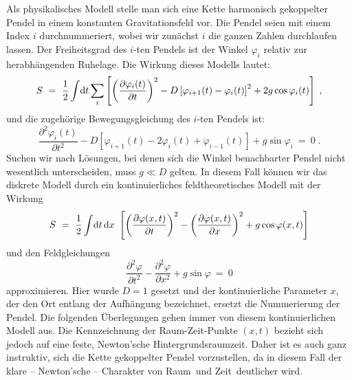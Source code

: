 Als physikalisches Modell stelle man sich eine Kette harmonisch gekoppelter
Pendel in einem konstanten Gravitationsfeld vor. Die Pendel seien
mit einem Index $i$ durchnummeriert, wobei wir zun\"achst $i$ die
ganzen Zahlen durchlaufen lassen. Der Freiheitsgrad des $i$-ten 
Pendels ist der Winkel $\varphi_i$ relativ zur herabh\"angenden
Ruhelage. Die Wirkung dieses Modells lautet:
\[  S ~=~ \frac{1}{2} \int \! {\rm d} t \sum_i \left[   
       \left( \frac{\partial \varphi_i(t)}{\partial t} \right)^2 -
       D \left[ \varphi_{i+1}(t) -\varphi_i(t) \right]^2 +
       2 g \cos \varphi_i(t)  \right]  \;,    \]
und die zugeh\"orige Bewegungsgleichung des 
$i$-ten Pendels ist:
\begin{equation}
\label{discrete}
  \frac{\partial^2 \varphi_i(t)}{\partial t^2} -         
  D [\varphi_{i+1}(t) - 2 \varphi_i(t) + \varphi_{i-1}(t) ]
  + g \sin \varphi_i ~=~ 0 \;. 
\end{equation}             
Suchen wir nach L\"osungen, bei denen sich die Winkel benachbarter Pendel 
nicht wesentlich unterscheiden, muss $g\ll D$ gelten. 
In diesem Fall k\"onnen wir das diskrete Modell
durch ein kontinuierliches feldtheoretisches Modell mit der Wirkung
\[  S ~=~ \frac{1}{2} \int \! {\rm d} t\, {\rm d} x~ \left[   
        \left( \frac{\partial \varphi(x,t)}{\partial t} \right)^2 -
        \left( \frac{\partial \varphi(x,t)}{\partial x} \right)^2 +
        g \cos \varphi(x,t)  \right]     \]
und den Feldgleichungen 
\begin{equation}
\label{eq_cont}
  \frac{\partial^2 \varphi}{\partial t^2} -         
    \frac{\partial^2 \varphi}{\partial x^2} + g \sin \varphi ~=~ 0 
\end{equation}             
approximieren. Hier wurde $D=1$ gesetzt und der kontinuierliche
Parameter $x$, der den Ort entlang der Aufh\"angung bezeichnet,
ersetzt die Nummerierung der Pendel. Die folgenden \"Uberlegungen
gehen immer von diesem kontinuierlichen Modell aus.
Die Kennzeichnung der Raum-Zeit-Punkte $(x,t)$ bezieht sich jedoch auf 
eine feste, Newton'sche Hinter\-grunds\-raum\-zeit. Daher ist es auch
ganz instruktiv, sich die Kette gekoppelter Pendel vorzustellen,
da in diesem Fall der klare -- Newton'sche -- Charakter von \glqq Raum\grqq\ und
\glqq Zeit\grqq\ deutlicher wird.

